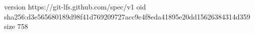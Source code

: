 version https://git-lfs.github.com/spec/v1
oid sha256:d3e565680189d98f41d769209727acc9c4f8eda41895e20dd15626384314d359
size 758
